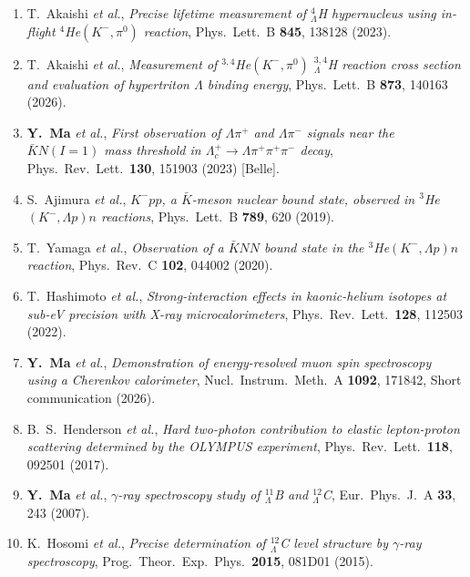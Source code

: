\documentclass[a4paper,11pt,fontset=none]{ctexart}
\begin{document}
{\small
\begin{enumerate}\setlength{\itemsep}{2pt}
  \item T.~Akaishi \textit{et al.}, \textit{Precise lifetime measurement of $^{4}_{\Lambda}$H hypernucleus using in-flight $^{4}$He$(K^{-},\pi^{0})$ reaction}, Phys.\ Lett.\ B \textbf{845}, 138128 (2023). 
  \item T.~Akaishi \textit{et al.}, \textit{Measurement of $^{3,4}$He$(K^-,\pi^0)$ $^{3,4}_{\Lambda}$H reaction cross section and evaluation of hypertriton $\Lambda$ binding energy}, Phys.\ Lett.\ B \textbf{873}, 140163 (2026). 
  \item \textbf{Y.~Ma} \textit{et al.}, \textit{First observation of $\Lambda\pi^+$ and $\Lambda\pi^-$ signals near the $\bar{K}N(I{=}1)$ mass threshold in $\Lambda_c^+\!\to\Lambda\pi^+\pi^+\pi^-$ decay}, Phys.\ Rev.\ Lett.\ \textbf{130}, 151903 (2023) [Belle]. 
  \item S.~Ajimura \textit{et al.}, \textit{$K^-pp$, a $\bar{K}$-meson nuclear bound state, observed in $^3$He$(K^-,\Lambda p)n$ reactions}, Phys.\ Lett.\ B \textbf{789}, 620 (2019). 
  \item T.~Yamaga \textit{et al.}, \textit{Observation of a $\bar{K}NN$ bound state in the $^3$He$(K^-,\Lambda p)n$ reaction}, Phys.\ Rev.\ C \textbf{102}, 044002 (2020). 
  \item T.~Hashimoto \textit{et al.}, \textit{Strong-interaction effects in kaonic-helium isotopes at sub-eV precision with X-ray microcalorimeters}, Phys.\ Rev.\ Lett.\ \textbf{128}, 112503 (2022). 
  \item \textbf{Y.~Ma} \textit{et al.}, \textit{Demonstration of energy-resolved muon spin spectroscopy using a Cherenkov calorimeter}, Nucl.\ Instrum.\ Meth.\ A \textbf{1092}, 171842, Short communication (2026). 
  \item B.~S.~Henderson \textit{et al.}, \textit{Hard two-photon contribution to elastic lepton-proton scattering determined by the OLYMPUS experiment}, Phys.\ Rev.\ Lett.\ \textbf{118}, 092501 (2017). 
  \item \textbf{Y.~Ma} \textit{et al.}, \textit{$\gamma$-ray spectroscopy study of $^{11}_{\Lambda}$B and $^{12}_{\Lambda}$C}, Eur.\ Phys.\ J.\ A \textbf{33}, 243 (2007). 
  \item K.~Hosomi \textit{et al.}, \textit{Precise determination of $^{12}_{\Lambda}$C level structure by $\gamma$-ray spectroscopy}, Prog.\ Theor.\ Exp.\ Phys.\ \textbf{2015}, 081D01 (2015). 
\end{enumerate}
}
\end{document}
